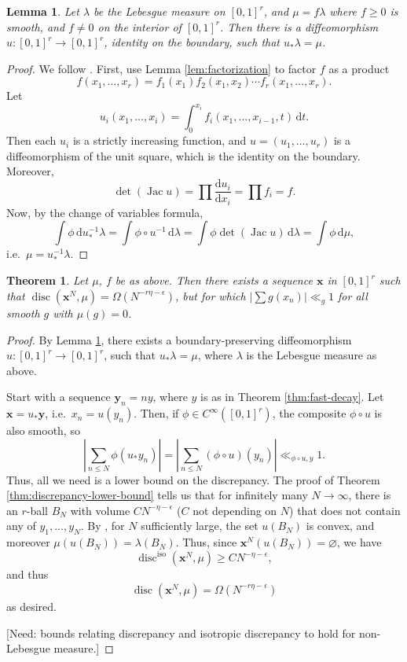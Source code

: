 \documentclass{article}
\DeclareMathOperator{\disc}{disc}
\DeclareMathOperator{\Jac}{Jac}
\newcommand{\bx}{{\boldsymbol x}}
\newcommand{\by}{{\boldsymbol y}}
\newcommand{\dd}{\mathrm{d}}
\newcommand{\iso}{\mathrm{iso}}
\newtheorem{theorem}[subsection]{Theorem}
\newtheorem{lemma}[subsection]{Lemma}
\theoremstyle{definition}
\begin{document}
\begin{lemma}\label{lem:translate-measure}
Let $\lambda$ be the Lebesgue measure on $[0,1]^r$, and $\mu=f\lambda$ 
where $f\geqslant 0$ is smooth, and $f\ne 0$ on the interior of $[0,1]^r$. Then 
there is a diffeomorphism $u\colon [0,1]^r\to [0,1]^r$, identity on the 
boundary, such that $u_\ast \lambda = \mu$. 
\end{lemma}
\begin{proof}
We follow \cite{moser-1965}. First, use Lemma \ref{lem:factorization} to 
factor $f$ as a product 
\[
	f(x_1,\dots,x_r) = f_1(x_1) f_2(x_1,x_2) \dotsm f_r(x_1,\dots,x_r) .
\]
Let 
\[
	u_i(x_1,\dots,x_i) = \int_0^{x_i} f_i(x_1,\dots,x_{i-1},t)\, \dd t .
\]
Then each $u_i$ is a strictly increasing function, and 
$u=(u_1,\dots,u_r)$ is a diffeomorphism of the unit square, which is the 
identity on the boundary. Moreover, 
\[
	\det (\Jac u) = \prod \frac{\dd u_i}{\dd x_i} = \prod f_i = f .
\]
Now, by the change of variables formula, 
\[
	\int \phi\, \dd u_\ast^{-1} \lambda = \int \phi\circ u^{-1}\, \dd\lambda = \int \phi \det(\Jac u)\, \dd \lambda = \int \phi\, \dd\mu ,
\]
i.e.~$\mu=u_\ast^{-1} \lambda$. 
\end{proof}

\begin{theorem}
Let $\mu$, $f$ be as above. Then there exists a sequence 
$\bx$ in $[0,1]^r$ such that $\disc(\bx^N,\mu)=\Omega(N^{-r\eta-\epsilon})$, 
but for which 
$|\sum g(x_n)| \ll_g 1$ for all smooth $g$ with $\mu(g)=0$. 
\end{theorem}
\begin{proof}
By Lemma \ref{lem:translate-measure}, there exists a boundary-preserving 
diffeomorphism $u\colon [0,1]^r \to [0,1]^r$, such that $u_\ast \lambda=\mu$, 
where $\lambda$ is the Lebesgue measure as above. 

Start with a sequence $\by_n=n y$, where $y$ is as in Theorem 
\ref{thm:fast-decay}. Let $\bx=u_\ast \by$, i.e.~$x_n = u(y_n)$. Then, if 
$\phi\in C^\infty([0,1]^r)$, the composite $\phi\circ u$ is also smooth, so 
\[
	\left| \sum_{n\leqslant N} \phi(u_\ast y_n)\right| = \left| \sum_{n\leqslant N} (\phi\circ u)(y_n)\right| \ll_{\phi\circ u, y} 1 .
\]
Thus, all we need is a lower bound on the discrepancy. The proof of 
Theorem \ref{thm:discrepancy-lower-bound} tells us that for infinitely 
many $N\to \infty$, there is an $r$-ball $B_N$ with volume 
$C N^{-\eta-\epsilon}$ ($C$ not depending on $N$) that does not contain any of 
$y_1,\dots,y_N$. By \cite[Th.2.1]{polyak-2001}, for $N$ sufficiently large, the 
set $u(B_N)$ is convex, and moreover $\mu(u(B_N)) = \lambda(B_N)$. Thus, since 
$\bx^N(u(B_N))=\varnothing$, we have 
\[
	\disc^\iso(\bx^N,\mu) \geqslant C N^{-\eta-\epsilon} ,
\]
and thus 
\[
	\disc(\bx^N,\mu) = \Omega( N^{-r\eta- \epsilon})
\]
as desired.

[Need: bounds relating discrepancy and isotropic discrepancy to hold for 
non-Lebesgue measure.]
\end{proof}
\end{document}
